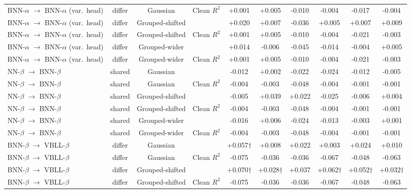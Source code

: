 \begin{table}[!htbp]
\begin{adjustbox}{max width=\textwidth,max totalheight=0.78\textheight}
\begin{tabular}{lccccccccc}
BNN-$\alpha$ $\rightarrow$ BNN-$\alpha$ (var.\ head) & differ & Gaussian & Clean $R^2$ & +0.001 & +0.005 & -0.010 & -0.004 & -0.017 & -0.004 \\
BNN-$\alpha$ $\rightarrow$ BNN-$\alpha$ (var.\ head) & differ & Grouped-shifted & \aucnorm{} & +0.020 & +0.007 & -0.036 & +0.005 & +0.007 & +0.009 \\
BNN-$\alpha$ $\rightarrow$ BNN-$\alpha$ (var.\ head) & differ & Grouped-shifted & Clean $R^2$ & +0.001 & +0.005 & -0.010 & -0.004 & -0.021 & -0.003 \\
BNN-$\alpha$ $\rightarrow$ BNN-$\alpha$ (var.\ head) & differ & Grouped-wider & \aucnorm{} & +0.014 & -0.006 & -0.045 & -0.014 & -0.004 & +0.005 \\
BNN-$\alpha$ $\rightarrow$ BNN-$\alpha$ (var.\ head) & differ & Grouped-wider & Clean $R^2$ & +0.001 & +0.005 & -0.010 & -0.004 & -0.021 & -0.003 \\
NN-$\beta$ $\rightarrow$ BNN-$\beta$ & shared & Gaussian & \aucnorm{} & -0.012 & +0.002 & -0.022 & -0.024 & -0.012 & -0.005 \\
NN-$\beta$ $\rightarrow$ BNN-$\beta$ & shared & Gaussian & Clean $R^2$ & -0.004 & -0.003 & -0.048 & -0.004 & -0.001 & -0.001 \\
NN-$\beta$ $\rightarrow$ BNN-$\beta$ & shared & Grouped-shifted & \aucnorm{} & -0.005 & +0.039 & +0.022 & -0.025 & -0.006 & +0.004 \\
NN-$\beta$ $\rightarrow$ BNN-$\beta$ & shared & Grouped-shifted & Clean $R^2$ & -0.004 & -0.003 & -0.048 & -0.004 & -0.001 & -0.001 \\
NN-$\beta$ $\rightarrow$ BNN-$\beta$ & shared & Grouped-wider & \aucnorm{} & -0.016 & +0.006 & -0.024 & -0.013 & -0.003 & +0.001 \\
NN-$\beta$ $\rightarrow$ BNN-$\beta$ & shared & Grouped-wider & Clean $R^2$ & -0.004 & -0.003 & -0.048 & -0.004 & -0.001 & -0.001 \\
BNN-$\beta$ $\rightarrow$ VBLL-$\beta$ & differ & Gaussian & \aucnorm{} & +0.057$\dagger$ & +0.008 & +0.022 & +0.003 & +0.024 & +0.010 \\
BNN-$\beta$ $\rightarrow$ VBLL-$\beta$ & differ & Gaussian & Clean $R^2$ & -0.075 & -0.036 & -0.036 & -0.067 & -0.048 & -0.063 \\
BNN-$\beta$ $\rightarrow$ VBLL-$\beta$ & differ & Grouped-shifted & \aucnorm{} & +0.070$\dagger$ & +0.028$\dagger$ & +0.037 & +0.062$\dagger$ & +0.052$\dagger$ & +0.032$\dagger$ \\
BNN-$\beta$ $\rightarrow$ VBLL-$\beta$ & differ & Grouped-shifted & Clean $R^2$ & -0.075 & -0.036 & -0.036 & -0.067 & -0.048 & -0.063 \\

\end{tabular}
\end{adjustbox}
\end{table}
